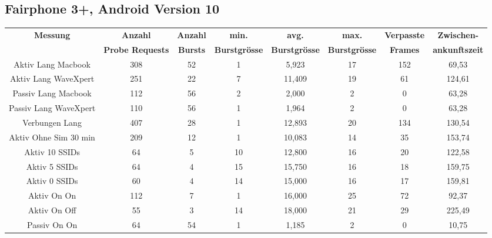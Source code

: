 \begin{landscape}
   \subsection*{Fairphone 3+, Android Version 10}
   \begin{table}[h!]
      \small
      \centering
      \begin{tabular}{|c|c|c|c|c|c|c|c|}
      \hline
      \textbf{Messung} & \textbf{Anzahl} & \textbf{Anzahl} & \textbf{min.} & \textbf{avg.} & \textbf{max.} & \textbf{Verpasste} & \textbf{Zwischen-}\\
      & \textbf{Probe Requests} & \textbf{Bursts} & \textbf{Burstgrösse} & \textbf{Burstgrösse} & \textbf{Burstgrösse} & \textbf{Frames} & \textbf{ankunftszeit}\\
      \hline
      Aktiv Lang Macbook & \phantom{0}308 & \phantom{0}52 & \phantom{0}1 & \phantom{0}5,923 & 17 & 152 & \phantom{0}69,53 \\
      Aktiv Lang WaveXpert & \phantom{0}251 & \phantom{0}22 & \phantom{0}7 & 11,409 & 19 & 61 & 124,61 \\
      Passiv Lang Macbook & \phantom{0}112 & \phantom{0}56 & \phantom{0}2 & \phantom{0}2,000 & \phantom{0}2 & \phantom{00}0 & \phantom{0}63,28 \\
      Passiv Lang WaveXpert & \phantom{0}110 & \phantom{0}56 & \phantom{0}1 & \phantom{0}1,964 & \phantom{0}2 & \phantom{00}0 & \phantom{0}63,28 \\
      Verbungen Lang & \phantom{0}407 & \phantom{0}28 & \phantom{0}1 & 12,893 & 20 & 134 & 130,54 \\
      Aktiv Ohne Sim 30 min & \phantom{0}209 & \phantom{0}12 & \phantom{0}1 & 10,083 & 14 & \phantom{0}35 & 153,74 \\
      Aktiv 10 SSIDs & \phantom{00}64 & \phantom{00}5 & 10 & 12,800 & 16 & \phantom{0}20 & 122,58 \\
      Aktiv 5 SSIDs & \phantom{00}64 & \phantom{00}4 & 15 & 15,750 & 16 & \phantom{0}18 & 159,75 \\
      Aktiv 0 SSIDs & \phantom{00}60 & \phantom{00}4 & 14 & 15,000 & 16 & \phantom{0}17 & 159,81 \\
      Aktiv On On & \phantom{0}112 & \phantom{00}7 & \phantom{0}1 & 16,000 & 25 & \phantom{0}72 & \phantom{0}92,37 \\
      Aktiv On Off & \phantom{00}55 & \phantom{00}3 & 14 & 18,000 & 21 & \phantom{0}29 & 225,49 \\
      Passiv On On & \phantom{00}64 & \phantom{0}54 & \phantom{0}1 & \phantom{0}1,185 & \phantom{0}2 & \phantom{00}0 & \phantom{0}10,75 \\

\end{tabular}
\end{table}
\end{landscape}
